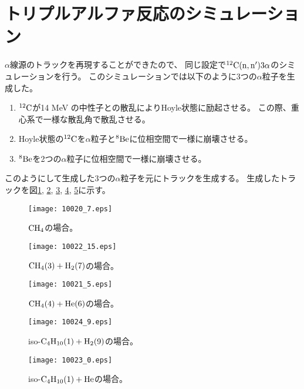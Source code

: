 \documentclass[../master]{subfiles}
\begin{document}
\section{トリプルアルファ反応のシミュレーション}
\label{sec::triple_alpha_simulation}
$\alpha$線源のトラックを再現することができたので、
同じ設定で${}^{12}{\rm C}({\rm n},{\rm n}')3\alpha$のシミュレーションを行う。
このシミュレーションでは以下のように3つの$\alpha$粒子を生成した。
\begin{enumerate}
\item
  ${}^{12}{\rm C}$が14 MeV の中性子との散乱によりHoyle状態に励起させる。
  この際、重心系で一様な散乱角で散乱させる。
\item
  Hoyle状態の${}^{12}{\rm C}$を$\alpha$粒子と${}^{8}{\rm Be}$に位相空間で一様に崩壊させる。
\item
  ${}^{8}{\rm Be}$を2つの$\alpha$粒子に位相空間で一様に崩壊させる。
\end{enumerate}
このようにして生成した3つの$\alpha$粒子を元にトラックを生成する。
生成したトラックを図\ref{fig::three_alpha_ch4}, \ref{fig::three_alpha_ch4_h2}, \ref{fig::three_alpha_ch4_he},
\ref{fig::three_alpha_ic4h10_h2}, \ref{fig::three_alpha_ic4h10_he}に示す。
\begin{figure}
  \centering
  \texttt{[image: 10020\_7.eps]}
  \caption{$\rm CH_{4}$の場合。}
  \label{fig::three_alpha_ch4}
\end{figure}
\begin{figure}
  \centering
  \texttt{[image: 10022\_15.eps]}
  \caption{$\rm CH_{4} (3) + H_{2} (7)$の場合。}
  \label{fig::three_alpha_ch4_h2}
\end{figure}
\begin{figure}
  \centering
  \texttt{[image: 10021\_5.eps]}
  \caption{$\rm CH_{4} (4) + He (6)$の場合。}
  \label{fig::three_alpha_ch4_he}
\end{figure}
\begin{figure}
  \centering
  \texttt{[image: 10024\_9.eps]}
  \caption{iso-$\rm C_{4}H_{10} (1) + H_{2} (9)$の場合。}
  \label{fig::three_alpha_ic4h10_h2}
\end{figure}
\begin{figure}
  \centering
  \texttt{[image: 10023\_0.eps]}
  \caption{iso-$\rm C_{4}H_{10} (1) + He$の場合。}
  \label{fig::three_alpha_ic4h10_he}
\end{figure}
\end{document}
